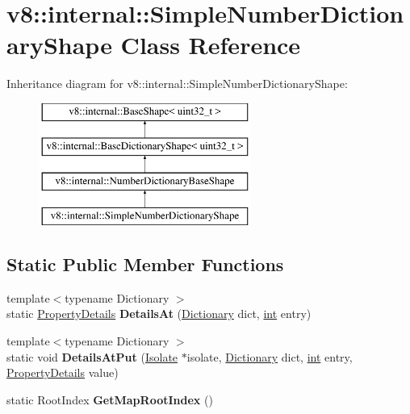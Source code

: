 \hypertarget{classv8_1_1internal_1_1SimpleNumberDictionaryShape}{}\section{v8\+:\+:internal\+:\+:Simple\+Number\+Dictionary\+Shape Class Reference}
\label{classv8_1_1internal_1_1SimpleNumberDictionaryShape}
Inheritance diagram for v8\+:\+:internal\+:\+:Simple\+Number\+Dictionary\+Shape\+:\begin{figure}[H]
\begin{center}
\leavevmode
\includegraphics[height=4.000000cm]{classv8_1_1internal_1_1SimpleNumberDictionaryShape}
\end{center}
\end{figure}
\subsection*{Static Public Member Functions}
\begin{DoxyCompactItemize}
\item 
\mbox{\label{classv8_1_1internal_1_1SimpleNumberDictionaryShape_ae80af9ca5e6b1eaa1cc023dc1128842d}} 
{\footnotesize template$<$typename Dictionary $>$ }\\static \mbox{\hyperlink{classv8_1_1internal_1_1PropertyDetails}{Property\+Details}} {\bfseries Details\+At} (\mbox{\hyperlink{classv8_1_1internal_1_1Dictionary}{Dictionary}} dict, \mbox{\hyperlink{classint}{int}} entry)
\item 
\mbox{\label{classv8_1_1internal_1_1SimpleNumberDictionaryShape_a6b31ce6d6ad62d42fe6840c7de1888b7}} 
{\footnotesize template$<$typename Dictionary $>$ }\\static void {\bfseries Details\+At\+Put} (\mbox{\hyperlink{classv8_1_1internal_1_1Isolate}{Isolate}} $\ast$isolate, \mbox{\hyperlink{classv8_1_1internal_1_1Dictionary}{Dictionary}} dict, \mbox{\hyperlink{classint}{int}} entry, \mbox{\hyperlink{classv8_1_1internal_1_1PropertyDetails}{Property\+Details}} value)
\item 
\mbox{\label{classv8_1_1internal_1_1SimpleNumberDictionaryShape_a58558de8444e82cb23168d4d5b2ca056}} 
static Root\+Index {\bfseries Get\+Map\+Root\+Index} ()
\end{DoxyCompactItemize}
